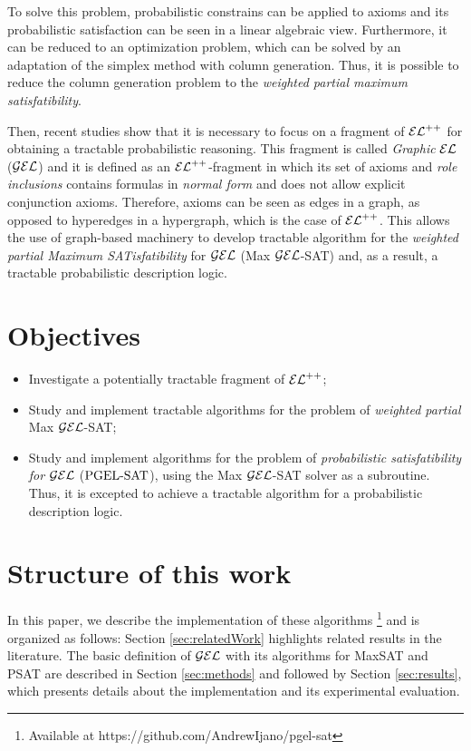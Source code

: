To solve this problem, probabilistic constrains can be applied to axioms and its probabilistic satisfaction can be seen in a linear algebraic view. Furthermore, it can be reduced to an optimization problem, which can be solved by an adaptation of the simplex method with column generation. \citep{Fin2019b} Thus, it is possible to reduce the column generation problem to the \emph{weighted partial maximum satisfatibility}.

Then, recent studies show that it is necessary to focus on a fragment of $\mathcal{EL}^{++}$ for obtaining a tractable probabilistic reasoning. This fragment is called \emph{Graphic} $\mathcal{EL}$ ($\mathcal{GEL}$) and it is defined as an $\mathcal{EL}^{++}$-fragment in which its set of axioms and \emph{role inclusions} contains formulas in \emph{normal form} and does not allow explicit conjunction axioms. Therefore, axioms can be seen as edges in a graph, as opposed to hyperedges in a hypergraph, which is the case of $\mathcal{EL}^{++}$. This allows the use of graph-based machinery to develop tractable algorithm for the \emph{weighted partial Maximum SATisfatibility} for $\mathcal{GEL}$ (Max $\mathcal{GEL}$-SAT) and, as a result, a tractable probabilistic description logic.

\section{Objectives}
\begin{itemize}
  \item Investigate a potentially tractable fragment of $\mathcal{EL}^{++}$;
  \item Study and implement tractable algorithms for the problem of \emph{weighted partial} Max $\mathcal{GEL}$-SAT;
  \item Study and implement algorithms for the problem of \emph{probabilistic satisfatibility for $\mathcal{GEL}$} ($\text{PGEL-SAT}$), using the Max $\mathcal{GEL}$-SAT solver as a subroutine. Thus, it is excepted to achieve a tractable algorithm for a probabilistic description logic.
\end{itemize}

\section{Structure of this work}
In this paper, we describe the implementation of these algorithms \footnote{Available at https://github.com/AndrewIjano/pgel-sat} and is organized as follows: Section \ref{sec:relatedWork} highlights related results in the literature. The basic definition of $\mathcal{GEL}$ with its algorithms for MaxSAT and PSAT are described in Section \ref{sec:methods} and followed by Section \ref{sec:results}, which presents details about the implementation and its experimental evaluation.
